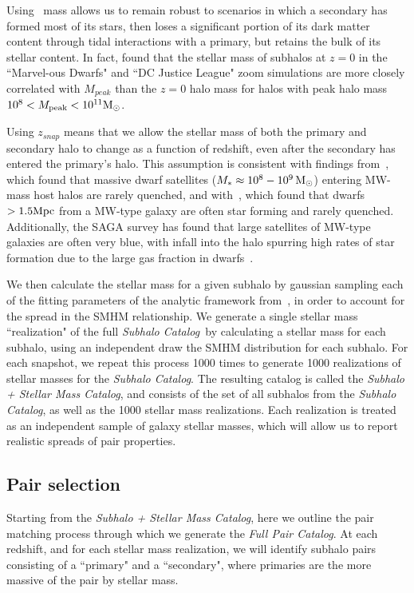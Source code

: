 \documentclass[twocolumn]{aastex631}
\newcommand{\subcat}{\textit{Subhalo Catalog}}
\newcommand{\starcat}{\textit{Subhalo + Stellar Mass Catalog}}
\newcommand{\paircat}{\textit{Full Pair Catalog}}
\begin{document}
    Using \Mpeak\ mass allows us to remain robust to scenarios in which a secondary has formed most of its stars, then loses a significant portion of its dark matter content through tidal interactions with a primary, but retains the bulk of its stellar content.
    In fact, \citet{Munshi2021} found that the stellar mass of subhalos at $z=0$ in the ``Marvel-ous Dwarfs" and ``DC Justice League" zoom simulations are more closely correlated with $M_{peak}$ than the $z=0$ halo mass for halos with peak halo mass $10^8<M_{\rm peak}<10^{11} \mathrm{M}_\odot$. 

    Using $z_{snap}$ means that we allow the stellar mass of both the primary and secondary halo to change as a function of redshift, even after the secondary has entered the primary's halo. 
    This assumption is consistent with findings from~\cite{Akins2021}, which found that massive dwarf satellites ($M_*\approx 10^8-10^9\, \mathrm{M}_\odot$) entering MW-mass host halos are rarely quenched, and with~\cite{geha13}, which found that dwarfs $>1.5\mathrm{Mpc}$ from a MW-type galaxy are often star forming and rarely quenched.
    Additionally, the SAGA survey has found that large satellites of MW-type galaxies are often very blue, with infall into the halo spurring high rates of star formation due to the large gas fraction in dwarfs~\citep{Mao2021}. 

    We then calculate the stellar mass for a given subhalo by gaussian sampling each of the fitting parameters of the analytic framework from~\cite{Moster2013}, in order to account for the spread in the SMHM relationship.
    We generate a single stellar mass ``realization" of the full \subcat\ by calculating a stellar mass for each subhalo, using an independent draw the SMHM distribution for each subhalo. 
    For each snapshot, we repeat this process 1000 times to generate 1000 realizations of stellar masses for the \subcat.
    The resulting catalog is called the \starcat, and consists of the set of all subhalos from the \subcat, as well as the 1000 stellar mass realizations. 
    Each realization is treated as an independent sample of galaxy stellar masses, which will allow us to report realistic spreads of pair properties.


    \subsection{Pair selection}\label{sec:methods-pairs}
    Starting from the \starcat, here we outline the pair matching process through which we generate the \paircat. 
    At each redshift, and for each stellar mass realization, we will identify subhalo pairs consisting of a ``primary" and a ``secondary", where primaries are the more massive of the pair by stellar mass.
\end{document}
